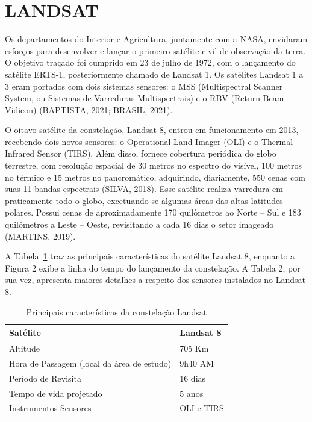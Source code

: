 \documentclass[fleqn]{icat-ufal}
\begin{document}

\section{LANDSAT}
\label{sec:LANDSAT}

Os departamentos do Interior e Agricultura, juntamente com a NASA, envidaram esforços para desenvolver e lançar o primeiro satélite civil de observação da terra. O objetivo traçado foi cumprido em 23 de julho de 1972, com o lançamento do satélite ERTS-1, posteriormente chamado de Landsat 1. Os satélites Landsat 1 a 3 eram portados com dois sistemas sensores: o MSS (Multispectral Scanner System, ou Sistemas de Varreduras Multispectrais) e o RBV (Return Beam Vidicon) (BAPTISTA, 2021; BRASIL, 2021).

O oitavo satélite da constelação, Landsat 8, entrou em funcionamento em 2013, recebendo dois novos sensores: o Operational Land Imager (OLI) e o Thermal Infrared Sensor (TIRS). Além disso, fornece cobertura periódica do globo terrestre, com resolução espacial de 30 metros no espectro do visível, 100 metros no térmico e 15 metros no pancromático, adquirindo, diariamente, 550 cenas com suas 11 bandas espectrais (SILVA, 2018). Esse satélite realiza varredura em praticamente todo o globo, excetuando-se algumas áreas das altas latitudes polares. Possui cenas de aproximadamente 170 quilômetros ao Norte – Sul e 183 quilômetros a Leste – Oeste, revisitando a cada 16 dias o setor imageado (MARTINS, 2019). 

A Tabela~\ref{table:landsat8} traz as principais características do satélite Landsat 8, enquanto a Figura 2 exibe a linha do tempo do lançamento  da constelação. A Tabela 2, por sua vez, apresenta maiores detalhes a respeito dos sensores instalados no Landsat 8.

\begin{table}[htb]
 \label{table:landsat8}
\centering 
\caption[Principais características do Satélite Landsat8]{Principais características da constelação Landsat}
\vspace{2mm} %
\begin{tabular}{ll}
	\hline
	Satélite                                       & Landsat 8     \\ \hline
	Altitude                                       & 705 Km        \\
	Hora de Passagem (local da área de estudo)     & 9h40 AM       \\
	Período de Revisita                            & 16 dias       \\
	Tempo de vida projetado                        & 5 anos        \\
	Instrumentos Sensores                          & OLI e TIRS    \\
	\hline
\end{tabular}
\vspace{0.5\baselineskip}
\end{table}
\end{document}
